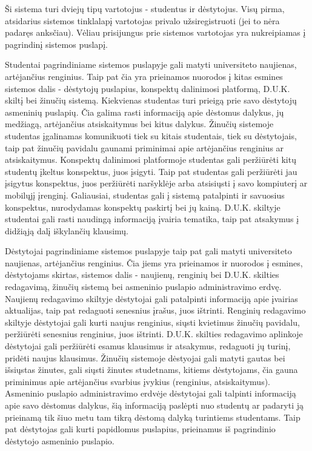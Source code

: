 \documentclass{VUMIFPSkursinis}
\begin{document}
Ši sistema turi dviejų tipų vartotojus - studentus ir dėstytojus. Visų pirma, atsidarius sistemos tinklalapį vartotojas privalo užsiregistruoti (jei to nėra padaręs anksčiau). Vėliau prisijungus prie sistemos vartotojas yra nukreipiamas į pagrindinį sistemos puslapį.

Studentai pagrindiniame sistemos puslapyje gali matyti universiteto naujienas, artėjančius renginius. Taip pat čia yra prieinamos nuorodos į kitas esmines sistemos dalis - dėstytojų puslapius, konspektų dalinimosi platformą, D.U.K. skiltį bei žinučių sistemą. Kiekvienas studentas turi prieigą prie savo dėstytojų asmeninių puslapių. Čia galima rasti informaciją apie dėstomus dalykus, jų medžiagą, artėjančius atsiskaitymus bei kitus dalykus. Žinučių sistemoje studentas įgalinamas komunikuoti tiek su kitais studentais, tiek su dėstytojais, taip pat žinučių pavidalu gaunami priminimai apie artėjančius renginius ar atsiskaitymus. Konspektų dalinimosi platformoje studentas gali peržiūrėti kitų studentų įkeltus konspektus, juos įsigyti. Taip pat studentas gali peržiūrėti jau įsigytus konspektus, juos peržiūrėti naršyklėje arba atsisiųsti į savo kompiuterį ar mobilųjį įrenginį. Galiausiai, studentas gali į sistemą patalpinti ir savuosius konspektus, nurodydamas konspektų paskirtį bei jų kainą. D.U.K. skiltyje studentai gali rasti naudingą informaciją įvairia tematika, taip pat atsakymus į didžiąją dalį iškylančių klausimų.

Dėstytojai pagrindiniame sistemos puslapyje taip pat gali matyti universiteto naujienas, artėjančius renginius. Čia jiems yra prieinamos ir nuorodos į esmines, dėstytojams skirtas, sistemos dalis - naujienų, renginių bei D.U.K. skilties redagavimą, žinučių sistemą bei asmeninio puslapio administravimo erdvę. Naujienų redagavimo skiltyje dėstytojai gali patalpinti informaciją apie įvairias aktualijas, taip pat redaguoti senesnius įrašus, juos ištrinti. Renginių redagavimo skiltyje dėstytojai gali kurti naujus renginius, siųsti kvietimus žinučių pavidalu, peržiūrėti senesnius renginius, juos ištrinti. D.U.K. skilties redagavimo aplinkoje dėstytojai gali peržiūrėti esamus klausimus ir atsakymus, redaguoti jų turinį, pridėti naujus klausimus. Žinučių sistemoje dėstyojai gali matyti gautas bei išsiųstas žinutes, gali siųsti žinutes studetnams, kitiems dėstytojams, čia gauna priminimus apie artėjančius svarbius įvykius (renginius, atsiskaitymus). Asmeninio puslapio administravimo erdvėje dėstytojai gali talpinti informaciją apie savo dėstomus dalykus, šią informaciją paslėpti nuo studentų ar padaryti ją prieinamą tik šiuo metu tam tikrą dėstomą dalyką turintiems studentams. Taip pat dėstytojas gali kurti papidlomus puslapius, prieinamus iš pagrindinio dėstytojo asmeninio puslapio.
\end{document}
